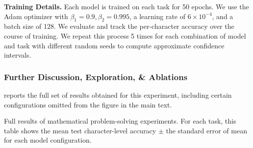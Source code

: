 \textbf{Training Details.} Each model is trained on each task for 50 epochs. We use the Adam optimizer with $\beta_1 = 0.9, \beta_2 = 0.995$, a learning rate of $6 \times 10^{-4}$, and a batch size of 128. We evaluate and track the per-character accuracy over the course of training. We repeat this process 5 times for each combination of model and task with different random seeds to compute approximate confidence intervals.

\subsubsection*{Further Discussion, Exploration, \& Ablations}

 reports the full set of results obtained for this experiment, including certain configurations omitted from the figure in the main text.

\begin{table}
    \resizebox{\textwidth}{!}{%
    
    }
    \vskip 10pt
    \caption{Full results of mathematical problem-solving experiments. For each task, this table shows the mean test character-level accuracy $\pm$ the standard error of mean for each model configuration.}\label{tab:math_full_results}
\end{table}






